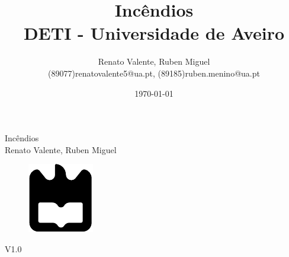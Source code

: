\documentclass[a4paper,11pt]{report}
\makeatletter
\def\titulo{Incêndios}
\def\data{\today}
\def\autores{Renato Valente, Ruben Miguel}
\def\autorescontactos{(89077)renatovalente5@ua.pt, (89185)ruben.menino@ua.pt}
\def\versao{V1.0}
\def\departamento{DETI - Universidade de Aveiro}
\makeatother
\begin{document}
%
%
\begin{titlepage}

\begin{center}
%
\vspace*{50mm}
%
{\Huge \titulo}\\ 
%
\vspace{10mm}
%
{\LARGE \autores}\\ 
%
%
\vspace{30mm}
%
\begin{figure}[h]
\center
\includegraphics{ua.pdf}
\end{figure}
%
\vspace{30mm}
\end{center}
%
\begin{flushright}
\versao
\end{flushright}
\end{titlepage}

%
%
%
%
\title{%
{\Huge\textbf{\titulo}}\\
{\Large \departamento\\}
}
%
\author{%
    \autores \\
    \autorescontactos
}
%
\date{\data}
%
\maketitle

\clearpage


\maketitle
\tableofcontents


\end{document}
